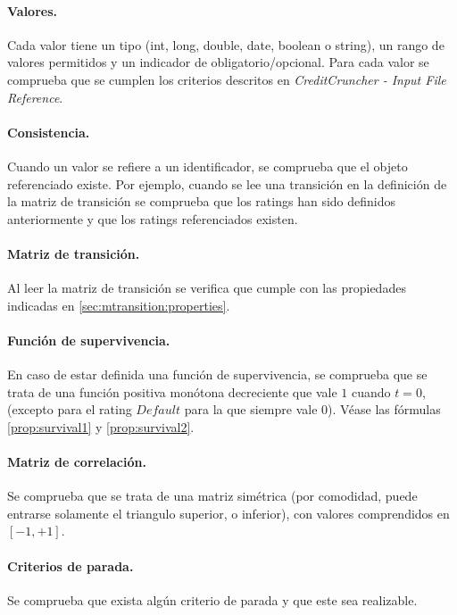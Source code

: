 \paragraph{Valores.} Cada valor tiene un tipo (int, long, double,
date, boolean o string), un rango de valores permitidos y un
indicador de obligatorio/opcional. Para cada valor se comprueba
que se cumplen los criterios descritos en
\emph{CreditCruncher - Input File Reference}.

\paragraph{Consistencia.} Cuando un valor se refiere a un identificador,
se comprueba que el objeto referenciado existe. Por ejemplo, cuando se
lee una transici\'on en la definici\'on de la matriz de transici\'on se
comprueba que los ratings han sido definidos anteriormente y que los
ratings referenciados existen.

\paragraph{Matriz de transici\'on.} Al leer la matriz de transici\'on
se verifica que cumple con las propiedades indicadas en
\ref{sec:mtransition:properties}.

\paragraph{Funci\'on de supervivencia.} En caso de estar definida
una funci\'on de supervivencia, se comprueba que se trata de una
funci\'on positiva mon\'otona decreciente que vale $1$ cuando $t=0$,
(excepto para el rating $Default$ para la que siempre vale $0$).
V\'ease las f\'ormulas \ref{prop:survival1} y \ref{prop:survival2}.

\paragraph{Matriz de correlaci\'on.} Se comprueba que se trata de
una matriz sim\'etrica (por comodidad, puede entrarse solamente
el triangulo superior, o inferior), con valores comprendidos
en $[-1,+1]$.

\paragraph{Criterios de parada.} Se comprueba que exista alg\'un
criterio de parada y que este sea realizable.

